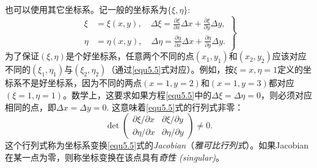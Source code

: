 也可以使用其它坐标系。记一般的坐标系为$\{ \xi, \eta \}$:
\begin{equation}
\left.
\begin{split}
    \xi &= \xi (x, y), \quad \Delta \xi = \frac{\partial \xi}{\partial x} \Delta x + \frac{\partial \xi}{\partial y} \Delta y, \\
    \eta &= \eta (x, y), \quad \Delta \eta = \frac{\partial \eta}{\partial x} \Delta x + \frac{\partial \eta}{\partial y} \Delta y.
\end{split}
\right\}
\label{equ5.5}
\end{equation}
为了保证$(\xi, \eta)$是个好坐标系，任意两个不同的点$(x_1, y_1)$和$(x_2, y_2)$应该对应不同的$(\xi_1, \eta_1)$与$(\xi_2, \eta_2)$（通过\eqref{equ5.5}式对应）。例如，按$\xi = x, \eta = 1$定义的坐标系不是好坐标系，因为不同的两点$(x = 1, y = 2)$和$(x = 1, y = 3)$都对应$(\xi = 1, \eta = 1)$。数学上，这要求如果方程\eqref{equ5.5}中的$\Delta \xi = \Delta \eta = 0$，则必须对应相同的点，即$\Delta x = \Delta y = 0$. 这意味着\eqref{equ5.5}式的行列式非零：
\begin{equation}
    \det \begin{pmatrix}
        \partial \xi / \partial x & \partial \xi / \partial y \\
        \partial \eta / \partial x & \partial \eta / \partial y
    \end{pmatrix} 
    \neq 0.
\label{equ5.6}
\end{equation}
这个行列式称为坐标系变换\eqref{equ5.5}式的\textit{Jacobian}（\textit{雅可比行列式}）。如果Jacobian在某一点为零，则称坐标变换在该点具有\textit{奇性 (singular)}。

